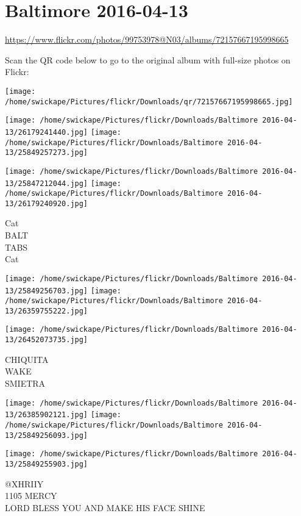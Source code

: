\documentclass[10pt,letterpaper]{article}
\title{}
\author{}
\date{}
\begin{document}
\section*{Baltimore 2016-04-13}

\url{https://www.flickr.com/photos/99753978@N03/albums/72157667195998665}

Scan the QR code below to go to the original album with full-size photos on Flickr:

\texttt{[image: /home/swickape/Pictures/flickr/Downloads/qr/72157667195998665.jpg]}
\pagebreak

\texttt{[image: /home/swickape/Pictures/flickr/Downloads/Baltimore 2016-04-13/26179241440.jpg]}
\texttt{[image: /home/swickape/Pictures/flickr/Downloads/Baltimore 2016-04-13/25849257273.jpg]}

\texttt{[image: /home/swickape/Pictures/flickr/Downloads/Baltimore 2016-04-13/25847212044.jpg]}
\texttt{[image: /home/swickape/Pictures/flickr/Downloads/Baltimore 2016-04-13/26179240920.jpg]}

Cat\\
BALT\\
TABS\\
Cat
\pagebreak

\texttt{[image: /home/swickape/Pictures/flickr/Downloads/Baltimore 2016-04-13/25849256703.jpg]}
\texttt{[image: /home/swickape/Pictures/flickr/Downloads/Baltimore 2016-04-13/26359755222.jpg]}

\vspace{0.25in}
\texttt{[image: /home/swickape/Pictures/flickr/Downloads/Baltimore 2016-04-13/26452073735.jpg]}

CHIQUITA\\
WAKE\\
SMIETRA
\pagebreak

\texttt{[image: /home/swickape/Pictures/flickr/Downloads/Baltimore 2016-04-13/26385902121.jpg]}
\texttt{[image: /home/swickape/Pictures/flickr/Downloads/Baltimore 2016-04-13/25849256093.jpg]}

\texttt{[image: /home/swickape/Pictures/flickr/Downloads/Baltimore 2016-04-13/25849255903.jpg]}

@XHRIIY\\
1105 MERCY\\
LORD BLESS YOU AND MAKE HIS FACE SHINE
\pagebreak
\end{document}
